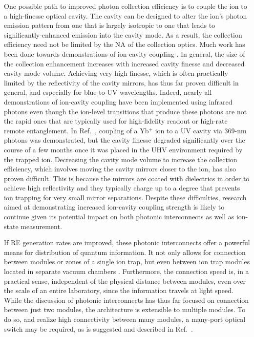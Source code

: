\documentclass[%
reprint,
 amsmath,amssymb,
]{revtex4-1}
\begin{document}
One possible path to improved photon collection efficiency is to couple the ion to a high-finesse optical cavity.  The cavity can be designed to alter the ion's photon emission pattern from one that is largely isotropic to one that leads to significantly-enhanced emission into the cavity mode.  As a result, the collection efficiency need not be limited by the NA of the collection optics.  Much work has been done towards demonstrations of ion-cavity coupling \cite{MundtCavity2002, KellerCavity2004, HerskindCavity2009, StuteCavity2012, SteinerCavity2013, StuteCavity2013, TakahashiCavity2018, BallanceCavity2017, BegleyCavity2016}.  In general, the size of the collection enhancement increases with increased cavity finesse and decreased cavity mode volume.  Achieving very high finesse, which is often practically limited by the reflectivity of the cavity mirrors, has thus far proven difficult in general, and especially for blue-to-UV wavelengths.  Indeed, nearly all demonstrations of ion-cavity coupling have been implemented using infrared photons even though the ion-level transitions that produce these photons are not the rapid ones that are typically used for high-fidelity readout or high-rate remote entanglement.  In Ref.~\cite{BallanceCavity2017}, coupling of a Yb$^+$ ion to a UV cavity via 369-nm photons was demonstrated, but the cavity finesse degraded significantly over the course of a few months once it was placed in the UHV environment required by the trapped ion.  Decreasing the cavity mode volume to increase the collection efficiency, which involves moving the cavity mirrors closer to the ion, has also proven difficult.  This is because the mirrors are coated with dielectrics in order to achieve high reflectivity and they typically charge up to a degree that prevents ion trapping for very small mirror separations. Despite these difficulties, research aimed at demonstrating increased ion-cavity coupling strength is likely to continue given its potential impact on both photonic interconnects as well as ion-state measurement.

If RE generation rates are improved, these photonic interconnects offer a powerful means for distribution of quantum information.  It not only allows for connection between modules or zones of a single ion trap, but even between ion trap modules located in separate vacuum chambers \cite{MaunzRemoteInterference2007, Moehring2007}.  Furthermore, the connection speed is, in a practical sense, independent of the physical distance between modules, even over the scale of an entire laboratory, since the information travels at light speed.  While the discussion of photonic interconnects has thus far focused on connection between just two modules, the architecture is extensible to multiple modules.  To do so, and realize high connectivity between many modules, a many-port optical switch may be required, as is suggested and described in Ref.~\cite{MonroeModularArch2014}.
\end{document}
